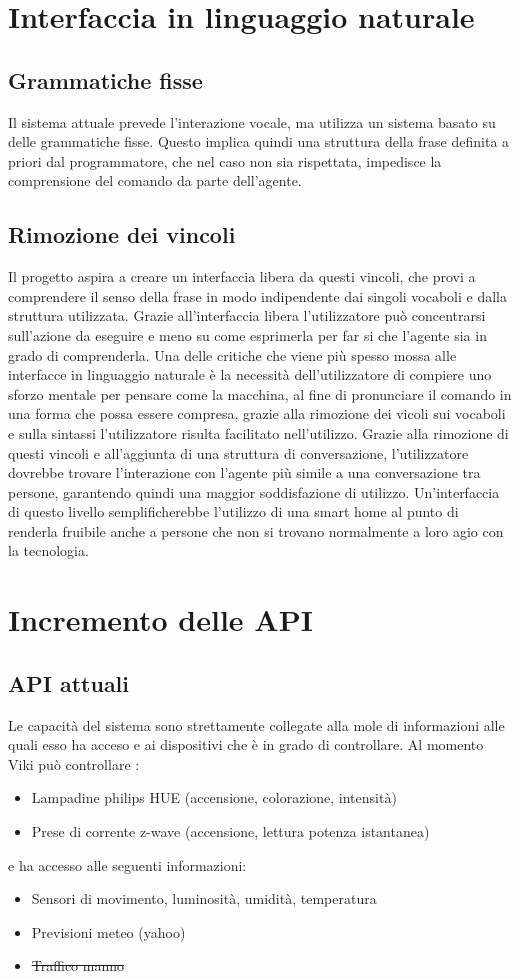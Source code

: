 \documentclass[twoside]{supsistudent}
\begin{document}
\section{Interfaccia in linguaggio naturale}
\subsection{Grammatiche fisse}
Il sistema attuale prevede l'interazione vocale, ma utilizza un sistema basato su delle grammatiche fisse. Questo implica quindi una struttura della frase definita a priori dal programmatore, che nel caso non sia rispettata, impedisce la comprensione del comando da parte dell'agente.
\subsection{Rimozione dei vincoli}
Il progetto aspira a creare un interfaccia libera da questi vincoli, che provi a comprendere il senso della frase in modo indipendente dai singoli vocaboli e dalla struttura utilizzata.
Grazie all'interfaccia libera l'utilizzatore può concentrarsi sull'azione da eseguire e meno su come esprimerla per far si che l'agente sia in grado di comprenderla. Una delle critiche che viene più spesso mossa alle interfacce in linguaggio naturale è la necessità dell'utilizzatore di compiere uno sforzo mentale per pensare come la macchina, al fine di pronunciare il comando in una forma che possa essere compresa, grazie alla rimozione dei vicoli sui vocaboli e sulla sintassi l'utilizzatore risulta facilitato nell'utilizzo.
Grazie alla rimozione di questi vincoli e all'aggiunta di una struttura di conversazione, l'utilizzatore dovrebbe trovare l'interazione con l'agente più simile a una conversazione tra persone, garantendo quindi una maggior soddisfazione di utilizzo.
Un'interfaccia di questo livello semplificherebbe l'utilizzo di una smart home al punto di renderla fruibile anche a persone che non si trovano normalmente a loro agio con la tecnologia.
\section{Incremento delle API}
\subsection{API attuali}
Le capacità del sistema sono strettamente collegate alla mole di informazioni alle quali esso ha acceso e ai dispositivi che è in grado di controllare. 
Al momento Viki può controllare :
\begin{itemize}
  \item Lampadine philips HUE (accensione, colorazione, intensità)
  \item Prese di corrente z-wave (accensione, lettura potenza istantanea)
\end{itemize}
e ha accesso alle seguenti informazioni:
\begin{itemize}
  \item Sensori di movimento, luminosità, umidità, temperatura
  \item Previsioni meteo (yahoo)
  \item \sout{Traffico manno}
\end{itemize}
\end{document}
